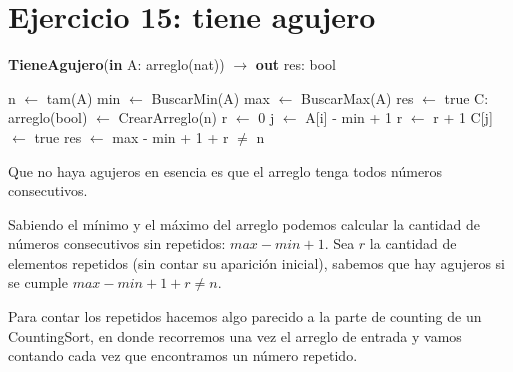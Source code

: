 \section{Ejercicio 15: tiene agujero}

\begin{algorithm}[H]
\caption{
    \textbf{TieneAgujero}(\textbf{in} A: arreglo(nat)) $\to$ \textbf{out} res: bool
}
\begin{algorithmic}[1]
    \State n $\gets$ tam(A) 
    \State min $\gets$ BuscarMin(A) 
    \State max $\gets$ BuscarMax(A) 
        \State res $\gets$ true
    \Else
        \State C: arreglo(bool) $\gets$ CrearArreglo(n) 
        \State r $\gets$ 0
         
            \State j $\gets$ A[i] - min + 1
                \State r $\gets$ r + 1
            \Else
                \State C[j] $\gets$ true
            \EndIf
        \EndFor
        \State res $\gets$ max - min + 1 + r $\neq$ n
    \EndIf
\end{algorithmic}
\end{algorithm}

Que no haya agujeros en esencia es que el arreglo tenga todos números consecutivos.

Sabiendo el mínimo y el máximo del arreglo podemos calcular la cantidad de números consecutivos sin repetidos: $max - min + 1$. Sea $r$ la cantidad de elementos repetidos (sin contar su aparición inicial), sabemos que hay agujeros si se cumple $max - min + 1 + r \neq n$.

Para contar los repetidos hacemos algo parecido a la parte de counting de un CountingSort, en donde recorremos una vez el arreglo de entrada y vamos contando cada vez que encontramos un número repetido.
